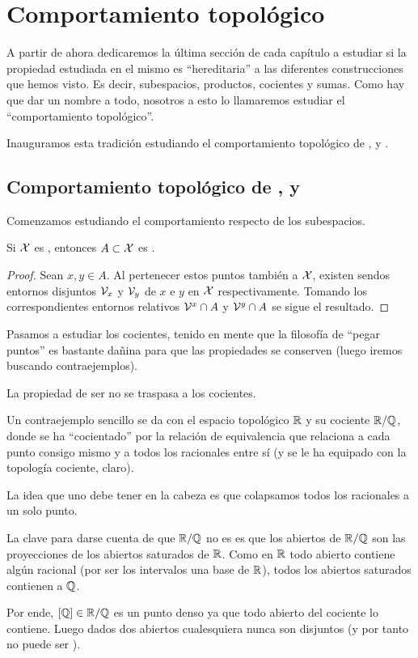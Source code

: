 \section{Comportamiento topológico} 
A partir de ahora dedicaremos la última sección de cada capítulo a estudiar si la propiedad estudiada en el mismo es ``hereditaria'' a las diferentes construcciones que hemos visto. Es decir, subespacios, productos, cocientes y sumas. Como hay que dar un nombre a todo, nosotros a esto lo llamaremos estudiar el ``comportamiento topológico''.

Inauguramos esta tradición estudiando el comportamiento topológico de \hausdorff, \frechet y \kolmogorov.
\subsection{Comportamiento topológico de \hausdorff, \frechet y \kolmogorov}
Comenzamos estudiando el comportamiento respecto de los subespacios.
\begin{lem}[Subespacios]
	Si $\mathcal{X}$ es \hausdorff, entonces $A\subset\mathcal{X}$ es \hausdorff.
\end{lem}
\begin{proof}
	 Sean $x,y\in A$. Al pertenecer estos puntos también a $\mathcal{X}$, existen sendos entornos disjuntos $\mathcal{V}_x$ y $\mathcal{V}_y$ de $x$ e $y$ en $\mathcal{X}$ respectivamente. Tomando los correspondientes entornos relativos $\mathcal{V}^x \cap A$ y $\mathcal{V}^y \cap A$ se sigue el resultado.
\end{proof}
Pasamos a estudiar los cocientes, tenido en mente que la filosofía de ``pegar puntos'' es bastante dañina para que las propiedades se conserven (luego iremos buscando contraejemplos).
\begin{obs}[Cocientes]
	La propiedad de ser \hausdorff no se traspasa a los cocientes.
	
	Un contraejemplo sencillo se da con el espacio topológico $\mathbb{R}$ y su cociente $\mathbb{R}/\mathbb{Q}$, donde se ha ``cocientado'' por la relación de equivalencia que relaciona a cada punto consigo mismo y a todos los racionales entre sí (y se le ha equipado con la topología cociente, claro).
	
	La idea que uno debe tener en la cabeza es que colapsamos todos los racionales a un solo punto.
	
	La clave para darse cuenta de que $\mathbb{R}/\mathbb{Q}$ no es \hausdorff es que los abiertos de $\mathbb{R}/\mathbb{Q}$ son las proyecciones de los abiertos saturados de $\mathbb{R}$. Como en $\mathbb{R}$ todo abierto contiene algún racional (por ser los intervalos una base de $\mathbb{R}$), todos los abiertos saturados contienen a $\mathbb{Q}$.
	
	Por ende, $\left [ \mathbb{Q} \right ]\in\mathbb{R}/\mathbb{Q}$ es un punto denso ya que todo abierto del cociente lo contiene. Luego dados dos abiertos cualesquiera nunca son disjuntos (y por tanto no puede ser \hausdorff).
\end{obs}
